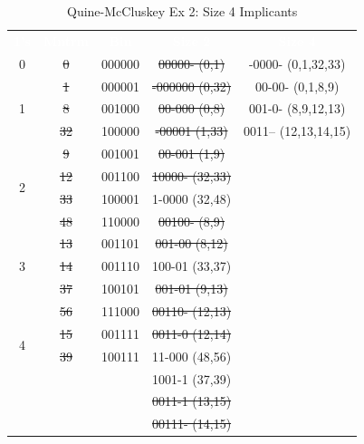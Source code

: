 \begin{table}[H]
	\sffamily
	\newcommand{\head}[1]{\textcolor{white}{\textbf{#1}}}		
	\begin{center}
		\begin{tabular}{ccc|c|c} 
			\rowcolor{black!75}
			\head{1's} & \head{Mntrm} & \head{Bin} 
				& \head{Size 2} & \head{Size 4} \\
							  0 & \sout{0} & 000000 & \sout{00000- (0,1)}   & -0000- (0,1,32,33) \\
			\cline{1-3}
			\multirow{3}{*}{1} & \sout{1}  & 000001 & \sout{-000000 (0,32)} & 00-00- (0,1,8,9)\\
							   & \sout{8}  & 001000 & \sout{00-000 (0,8)}   & 001-0- (8,9,12,13)\\
						       & \sout{32} & 100000 & \sout{-00001 (1,33)}  & 0011-- (12,13,14,15)\\
			\cline{1-3}
			\multirow{4}{*}{2} & \sout{9}  & 001001 & \sout{00-001 (1,9)}   & \\
							   & \sout{12} & 001100 & \sout{10000- (32,33)} & \\		
							   & \sout{33} & 100001 & 1-0000 (32,48)        & \\		
							   & \sout{48} & 110000 & \sout{00100- (8,9)}   & \\
			\cline{1-3}
			\multirow{3}{*}{3} & \sout{13} & 001101 & \sout{001-00 (8,12)}  & \\
							   & \sout{14} & 001110 & 100-01 (33,37)        & \\		
							   & \sout{37} & 100101 & \sout{001-01 (9,13)}  & \\		
							   & \sout{56} & 111000 & \sout{00110- (12,13)} & \\
			\cline{1-3}
			\multirow{2}{*}{4} & \sout{15} & 001111 & \sout{0011-0 (12,14)} & \\
							   & \sout{39} & 100111 & 11-000 (48,56)        & \\		
							   &    &        & 1001-1 (37,39) 		        & \\		
							   &    &        & \sout{0011-1 (13,15)}	    & \\		
							   &    &        & \sout{00111- (14,15)} 	    & \\		
			\hline
		\end{tabular}
	\end{center}
	\caption{Quine-McCluskey Ex 2: Size 4 Implicants}
  \label{ASM:tab:qm_ex_2_size_4_implicants}
\end{table}


